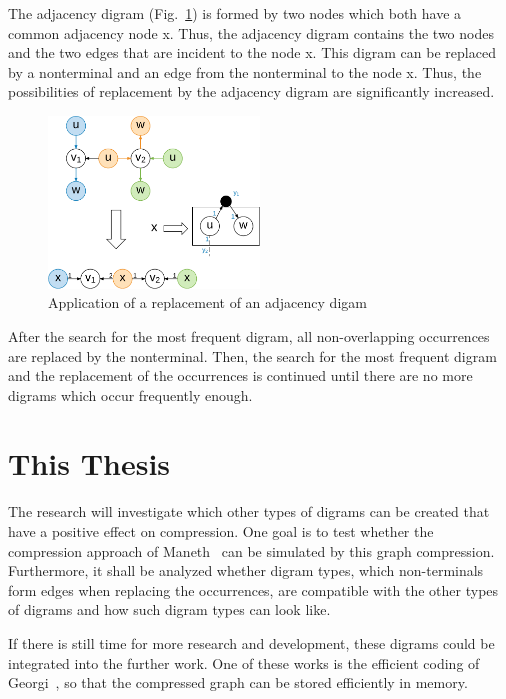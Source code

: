 \documentclass[a4paper]{scrartcl}
\begin{document}
The adjacency digram (Fig.~\ref{fig:adjazenzDigram}) is formed by two nodes which both have a common adjacency node x. Thus, the adjacency digram contains the two nodes and the two edges that are incident to the node x. This digram can be replaced by a nonterminal and an edge from the nonterminal to the node x.
Thus, the possibilities of replacement by the adjacency digram are significantly increased.


\begin{figure}[h]
	\centering
	\includegraphics[width=0.5\textwidth]{img/adjazenzDigram}
	\caption{Application of a replacement of an adjacency digam}
	\label{fig:adjazenzDigram}
\end{figure}

After the search for the most frequent digram, all non-overlapping occurrences are replaced by the nonterminal. Then, the search for the most frequent digram and the replacement of the occurrences is continued until there are no more digrams which occur frequently enough.



\section{This Thesis}

The research will investigate which other types of digrams can be created that have a positive effect on compression. One goal is to test whether the compression approach of Maneth~\cite{maneth} can be simulated by this graph compression. Furthermore, it shall be analyzed whether digram types, which non-terminals form edges when replacing the occurrences, are compatible with the other types of digrams and how such digram types can look like.

If there is still time for more research and development, these digrams could be integrated into the further work. One of these works is the efficient coding of Georgi~\cite{georgi}, so that the compressed graph can be stored efficiently in memory.
\end{document}
